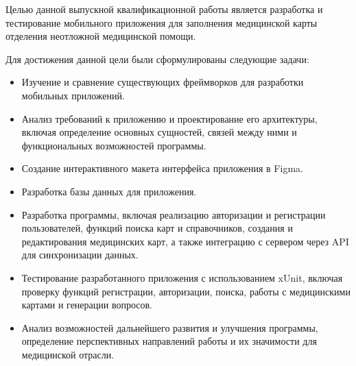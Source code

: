 Целью данной выпускной квалификационной работы является разработка и тестирование мобильного приложения для заполнения медицинской карты отделения неотложной медицинской помощи.

Для достижения данной цели были сформулированы следующие задачи:
\begin{itemize}
    \item Изучение и сравнение существующих фреймворков для разработки мобильных приложений.

    \item Анализ требований к приложению и проектирование его архитектуры, включая определение основных сущностей, связей между ними и функциональных возможностей программы.

    \item Создание интерактивного макета интерфейса приложения в Figma.

    \item Разработка базы данных для приложения.
    
    \item Разработка программы, включая реализацию авторизации и регистрации пользователей, функций поиска карт и справочников, создания и редактирования медицинских карт, а также интеграцию с сервером через API для синхронизации данных.

    \item Тестирование разработанного приложения с использованием xUnit, включая проверку функций регистрации, авторизации, поиска, работы с медицинскими картами и генерации вопросов.

    \item Анализ возможностей дальнейшего развития и улучшения программы, определение перспективных направлений работы и их значимости для медицинской отрасли.
\end{itemize}